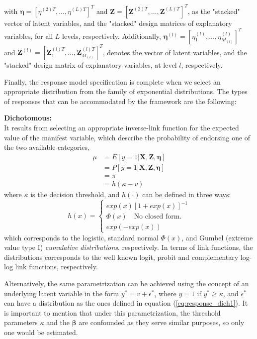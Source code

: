 \noindent with $\pmb{\eta}=\left[\eta^{(2)T}, \dots, \eta^{(L)T}\right]^{T}$ and $\mathbf{Z}=\left[\mathbf{Z}^{(2)T}, \dots, \mathbf{Z}^{(L)T}\right]^{T}$, as the "stacked" vector of latent variables, and the "stacked" design matrices of explanatory variables, for all $L$ levels, respectively. Additionally, $\pmb{\eta}^{(l)}=\left[\eta_{1}^{(l)}, \dots, \eta_{M_{(l)}}^{(l)}\right]^{T}$ and $\mathbf{Z}^{(l)}=\left[\mathbf{Z}_{1}^{(l)T}, \dots, \mathbf{Z}_{M_{(l)}}^{(l)T}\right]^{T}$, denotes the vector of latent variables, and the "stacked" design matrix of explanatory variables, at level $l$, respectively.

Finally, the response model specification is complete when we select an appropriate distribution from the family of exponential distributions. The types of responses that can be accommodated by the framework are the following:

\textbf{Dichotomous:} \\
	It results from selecting an appropriate inverse-link function for the expected value of the manifest variable, which describe the probability of endorsing one of the two available categories,
	\begin{equation} \label{eq:link_dich}
		\begin{split}
		\mu &= E[y=1 | \mathbf{X}, \mathbf{Z}, \pmb{\eta}] \\ 
		&= P[y=1 | \mathbf{X}, \mathbf{Z}, \pmb{\eta}] \\
		&= \pi \\
		&= h(\kappa - v)
		\end{split}	
	\end{equation}
	where $\kappa$ is the decision threshold, and $h(\cdot)$ can be defined in three ways:	
	\begin{equation} \label{eq:response_dich1}
		h(x) = 
		\begin{cases}
			exp(x)[1 + exp(x)]^{-1} \\
			\Phi(x) \quad \text{No closed form.} \\
			exp(-exp(x))
		\end{cases}
	\end{equation}
	which corresponds to the logistic, standard normal $\Phi(x)$, and Gumbel (extreme value type I) \textit{cumulative distributions}, respectively. In terms of link functions, the distributions corresponds to the well known logit, probit and complementary log-log link functions, respectively. 
	
	Alternatively, the same parametrization can be achieved using the concept of an underlying latent variable in the form $y^{*} = v + \epsilon^{*}$, where $y = 1$ if $y^{*} \ge \kappa$, and $\epsilon^{*}$ can have a distribution as the ones defined in equation (\ref{eq:response_dich1}). It is important to mention that under this parametrization, the threshold parameters $\kappa$ and the $\pmb{\beta}$ {\color{red} are confounded as they serve similar purposes, so only one would be estimated}.
	
